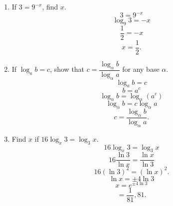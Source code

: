 \begin{enumerate}
\item If $3 = 9^{-x}$, find $x$.
\newline
\[
3 = 9^{-x}
\]
\[
\log_9 3 = -x
\]
\[
\frac{1}{2} = -x
\]
\[
x = \frac{1}{2}.
\]
\item If $\log_a b = c$, show that $c = \dfrac{\log_\alpha b}{\log_\alpha a}$ for any base $\alpha$.
\[
\log_a b = c
\]
\[
b = a^c
\]
\[
\log_\alpha b = \log_\alpha (a^c)
\]
\[
\log_\alpha b = c \log_\alpha a
\]
\[
c = \frac{\log_\alpha b}{\log_\alpha a}.
\]
\item
Find $x$ if $16\log_x 3 = \log_3 x$.
\[
16 \log_x 3 = \log_3 x
\]
\[
16 \frac{\ln 3}{\ln x} = \frac{\ln x}{\ln 3}
\]
\[
16 (\ln3)^2 = (\ln x)^2.
\]
\[
\ln x = \pm 4 \ln 3
\]
\[
x = e^{\pm 4 \ln 3}
\]
\[
=\frac{1}{81}, 81.
\]
\end{enumerate}